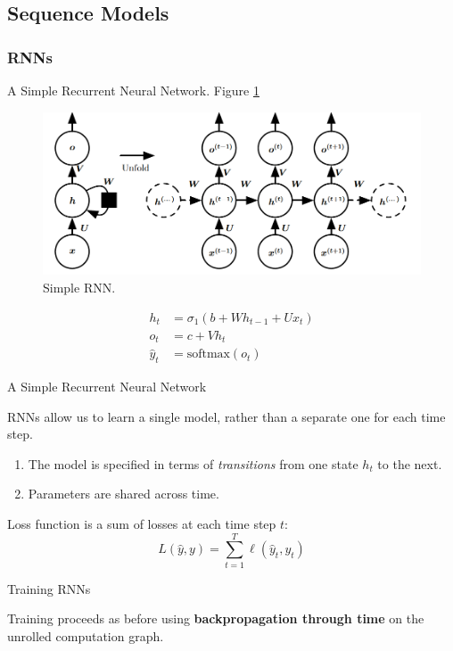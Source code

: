 \documentclass[english]{article}
\begin{document}
\subsection{Sequence Models}
\subsubsection{RNNs} %
\benum
\item 
 {A Simple Recurrent Neural Network}.  Figure \ref{Simple RNN}

\begin{figure}
  \centering
\includegraphics[width=0.8\linewidth]{rnn.png}
    \caption{Simple RNN.}
    \label{Simple RNN}
\end{figure}

\begin{align*}
h_t &= \sigma_1(b+Wh_{t-1}+Ux_t)\\
o_t &= c+Vh_t\\
\hat{y}_t &= \text{softmax}(o_t)
\end{align*}
 

\item 
 {A Simple Recurrent Neural Network}

RNNs allow us to learn a single model, rather than a separate one for each time step.
\begin{enumerate}
\item The model is specified in terms of \textit{transitions} from one state $h_t$ to the next.
\item Parameters are shared across time.
 
\end{enumerate}
Loss function is a sum of losses at each time step $t$:
$$L(\hat{y},y)=\sum_{t=1}^T \ell(\hat{y}_t, y_t)$$
 

\item 
 {Training RNNs}

Training proceeds as before using \textbf{backpropagation through time} on the unrolled computation graph.
 
\end{document}
